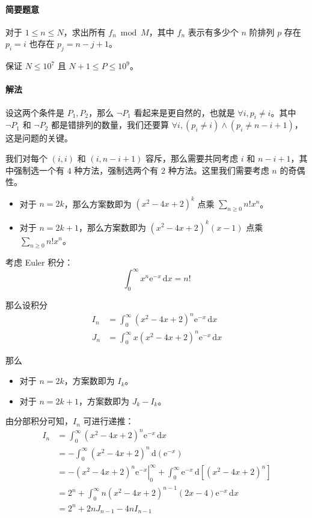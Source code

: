 \documentclass[12pt]{ctexart}
\newcommand{\di}{\ensuremath{\mathrm{\,d}}}
\newcommand{\me}{\ensuremath{\mathrm e}}
\theoremstyle{theorem}
\theoremstyle{theorem}
\begin{document}
\paragraph{简要题意} 对于 $1\le n\le N$，求出所有 $f_n \bmod M$，其中 $f_n$ 表示有多少个 $n$ 阶排列 $p$ 存在 $p_i=i$ 也存在 $p_j=n-j+1$。

保证 $N\le 10^7$ 且 $N+1\le P\le 10^9$。

\paragraph{解法} 设这两个条件是 $P_1,P_2$，那么 $\neg P_1$ 看起来是更自然的，也就是 $\forall i,p_i\neq i$。其中 $\neg P_1$ 和 $\neg P_2$ 都是错排列的数量，我们还要算 $\forall i, (p_i \neq i) \wedge (p_i \neq n-i+1)$，这是问题的关键。

我们对每个 $(i,i)$ 和 $(i,n-i+1)$ 容斥，那么需要共同考虑 $i$ 和 $n-i+1$，其中强制选一个有 $4$ 种方法，强制选两个有 $2$ 种方法。这里我们需要考虑 $n$ 的奇偶性。

\begin{itemize}
\item 对于 $n=2k$，那么方案数即为 $(x^2-4x+2)^k$ 点乘 $\sum_{n\ge 0} n! x^n$。
\item 对于 $n=2k+1$，那么方案数即为 $(x^2-4x+2)^k(x-1)$ 点乘 $\sum_{n\ge 0} n! x^n$。
\end{itemize}

考虑 Euler 积分：
$$
\int_0^\infty x^n \me^{-x} \di x = n!
$$

那么设积分
\begin{align*}
I_n &= \int_0^\infty (x^2-4x+2)^n \me^{-x} \di x\\
J_n &= \int_0^\infty x(x^2-4x+2)^n \me^{-x} \di x
\end{align*}

那么
\begin{itemize}
\item 对于 $n=2k$，方案数即为 $I_k$。
\item 对于 $n=2k+1$，方案数即为 $J_k - I_k$。
\end{itemize}

由分部积分可知，$I_n$ 可进行递推：
\begin{align*}
I_n &= \int_0^\infty (x^2-4x+2)^n \me^{-x}\di x\\
 &= -\int_0^\infty (x^2-4x+2)^n \di (\me^{-x})\\
 &= \left. -(x^2-4x+2)^n \me^{-x} \right |_0^\infty + \int_0^\infty \me^{-x} \di \left[ (x^2-4x+2)^n \right]\\
 &= 2^n + \int_0^\infty n(x^2-4x+2)^{n-1}(2x-4)\me^{-x} \di x\\
 &= 2^n + 2nJ_{n-1} - 4nI_{n-1}
\end{align*}
\end{document}
